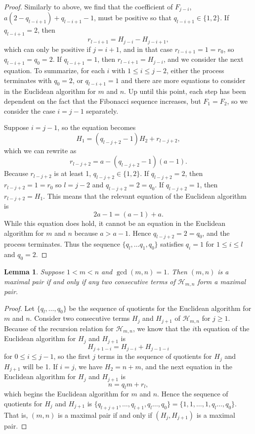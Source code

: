 \documentclass{amsart}
\newtheorem{lemma}{Lemma}
\begin{document}
\begin{proof}
Similarly to above, we find that the coefficient of $F_{j-i}$, $a(2-q_{l-i+1}) +q_{l-i+1} -1$, must be positive so that $q_{l-i+1} \in \{1,2\}$.  If $q_{l-i+1} = 2$, then $$r_{l-i+1} = H_{j-i} - H_{j-i+1},$$ which can only be positive if $j = i+1$, and in that case $r_{l-i+1} = 1 = r_0$, so $q_{l-i+1} = q_0 = 2$. If $q_{l-i+1} = 1$, then $r_{l-i+1} = H_{j-i}$, and we consider the next equation. To summarize, for each $i$ with $1 \le i \le j-2$, either the process terminates with $q_0 = 2$, or $q_{l-i+1} = 1$ and there are more equations to consider in the Euclidean algorithm for $m$ and $n$. Up until this point, each step has been dependent on the fact that the Fibonacci sequence increases, but $F_1 = F_2$, so we consider the case $i = j-1$ separately.

Suppose $i = j-1$, so the equation becomes $$H_{1} = (q_{l-j+2}-1) H_{2} + r_{l-j+2}, $$ which we can rewrite as $$r_{l-j+2} = a - (q_{l-j+2}-1) (a-1).$$
Because $r_{l-j+2}$ is at least 1, $q_{l-j+2} \in \{1,2\}$.  If $q_{l-j+2} = 2$, then $r_{l-j +2} = 1  = r_0$ so $l = j-2$ and $q_{l-j+2} = 2 = q_0$. If $q_{l-j+2} = 1$, then $r_{l-j+2} = H_1$. This means that the relevant equation of the Euclidean algorithm is $$ 2a-1 = (a-1) + a.$$  While this equation does hold, it cannot be an equation in the Euclidean algorithm for $m$ and $n$ because $a > a-1$. Hence $q_{l-j+2} = 2 = q_0$, and the process terminates. Thus the sequence  $\{q_l, \ldots q_1, q_0 \}$ satisfies $q_i =1$ for $1\le i \le l$ and $q_0 = 2$.

\end{proof}

\begin{lemma}\label{lem:maxpairs}
Suppose $1<  m < n$ and $\gcd(m,n) = 1$. Then $(m,n)$ is a maximal pair if and only if any two consecutive terms of $\mathcal H_{m,n}$ form a maximal pair.
\end{lemma}

\begin{proof}
Let $\{q_l, \ldots, q_0\}$ be the sequence of quotients for the Euclidean algorithm for $m$ and $n$.
Consider two consecutive terms $H_j$ and $H_{j+1}$ of $\mathcal H_{m,n}$ for $j \ge 1$. Because of the recursion relation for $\mathcal H_{m,n}$, we know that the $i$th equation of the Euclidean algorithm for $H_{j}$ and $H_{j+1}$ is $$H_{j+1 - i} = H_{j-i} + H_{j-1-i}$$ for $0 \le i \le j-1$, so the first $j$ terms in the sequence of quotients for $H_{j}$ and $H_{j+1}$ will be 1. If $i = j$, we have $H_2 = n + m$, and the next equation in the Euclidean algorithm for $H_j$ and $H_{j+1}$ is  $$ n = q_l m + r_l, $$
which begins the Euclidean algorithm for $m$ and $n$. Hence the sequence of quotients for $H_{j}$ and $H_{j+1}$ is 
 $\{q_{l + j+1}, \ldots, q_{l+1}, q_l \ldots, q_0\} = \{1, 1, \ldots, 1, q_l \ldots, q_0\} $. That is, $(m,n)$ is a maximal pair if and only if $(H_j, H_{j+1})$ is a maximal pair.

\end{proof}
\end{document}
